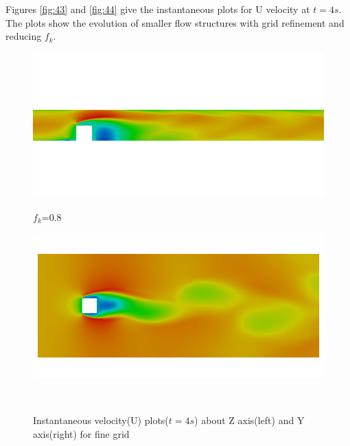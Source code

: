 Figures \ref{fig:43} and \ref{fig:44} give the instantaneous plots for U velocity at $t=4s$. The plots show the evolution of smaller flow structures with grid refinement and reducing $f_k$. 



\begin{figure}[H]
\begin{minipage}[b]{0.5\linewidth}
\includegraphics[scale=0.25]{figure/fine/eight/Umag_z.png}
\caption*{$f_k$=0.8}
\end{minipage}
\begin{minipage}[b]{0.5\linewidth}
\includegraphics[scale=0.25]{figure/fine/eight/Umag_y.png}
\caption*{}
\end{minipage}\\
\caption{Instantaneous velocity(U) plots($t=4s$) about Z axis(left) and Y axis(right) for fine grid}
\label{fig:eight}
\end{figure}
